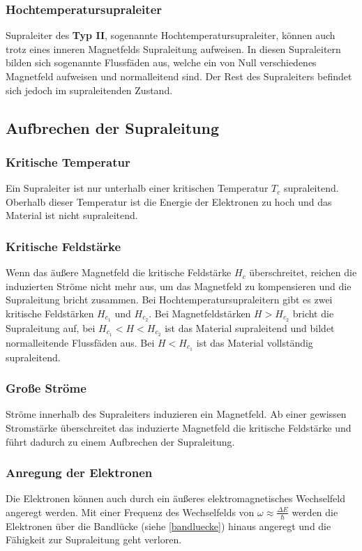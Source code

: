 \documentclass[12pt]{article}
\begin{document}
\subsubsection{Hochtemperatursupraleiter}
Supraleiter des \textbf{Typ II}, sogenannte Hochtemperatursupraleiter, können auch trotz eines inneren Magnetfelds Supraleitung aufweisen. In diesen Supraleitern bilden sich sogenannte Flussfäden aus, welche ein von Null verschiedenes Magnetfeld aufweisen und normalleitend sind. Der Rest des Supraleiters befindet sich jedoch im supraleitenden Zustand.

\subsection{Aufbrechen der Supraleitung}
\subsubsection{Kritische Temperatur}
Ein Supraleiter ist nur unterhalb einer kritischen Temperatur $T_c$ supraleitend. Oberhalb dieser Temperatur ist die Energie der Elektronen zu hoch und das Material ist nicht supraleitend.
\subsubsection{Kritische Feldstärke}
Wenn das äußere Magnetfeld die kritische Feldstärke $H_c$ überschreitet, reichen die induzierten Ströme nicht mehr aus, um das Magnetfeld zu kompensieren und die Supraleitung bricht zusammen. Bei Hochtemperatursupraleitern gibt es zwei kritische Feldstärken $H_{c_1}$ und  $H_{c_2}$. Bei Magnetfeldstärken $H>H_{c_2}$ bricht die Supraleitung auf, bei $H_{c_1}<H<H_{c_2}$ ist das Material supraleitend und bildet normalleitende Flussfäden aus. Bei $H<H_{c_1}$ ist das Material vollständig supraleitend.
\subsubsection{Große Ströme}
Ströme innerhalb des Supraleiters induzieren ein Magnetfeld. Ab einer gewissen Stromstärke überschreitet das induzierte Magnetfeld die kritische Feldstärke und führt dadurch zu einem Aufbrechen der Supraleitung.
\subsubsection{Anregung der Elektronen}
Die Elektronen können auch durch ein äußeres elektromagnetisches Wechselfeld angeregt werden. Mit einer Frequenz des Wechselfelds von $\omega\approx\frac{\Delta E}{\hbar}$ werden die Elektronen über die Bandlücke (siehe \ref{bandluecke}) hinaus angeregt und die Fähigkeit zur Supraleitung geht verloren.
\end{document}
